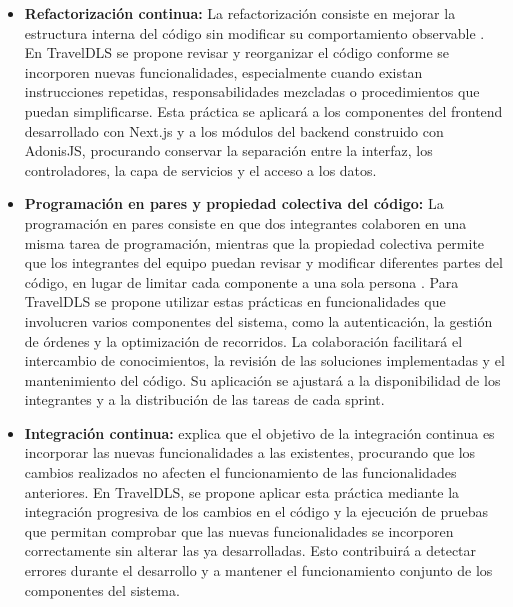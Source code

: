 \begin{itemize}
	\item \textbf{Refactorización continua:} La refactorización consiste en mejorar la estructura interna del código sin modificar su comportamiento observable \parencite{beck2000xp}. En TravelDLS se propone revisar y reorganizar el código conforme se incorporen nuevas funcionalidades, especialmente cuando existan instrucciones repetidas, responsabilidades mezcladas o procedimientos que puedan simplificarse. Esta práctica se aplicará a los componentes del frontend desarrollado con Next.js y a los módulos del backend construido con AdonisJS, procurando conservar la separación entre la interfaz, los controladores, la capa de servicios y el acceso a los datos.

	\item \textbf{Programación en pares y propiedad colectiva del código:} La programación en pares consiste en que dos integrantes colaboren en una misma tarea de programación, mientras que la propiedad colectiva permite que los integrantes del equipo puedan revisar y modificar diferentes partes del código, en lugar de limitar cada componente a una sola persona \parencite{beck2000xp}. Para TravelDLS se propone utilizar estas prácticas en funcionalidades que involucren varios componentes del sistema, como la autenticación, la gestión de órdenes y la optimización de recorridos. La colaboración facilitará el intercambio de conocimientos, la revisión de las soluciones implementadas y el mantenimiento del código. Su aplicación se ajustará a la disponibilidad de los integrantes y a la distribución de las tareas de cada sprint.
\end{itemize}

\begin{itemize}
	\item \textbf{Integración continua:} \textcite{bahit2012scrum} explica que el objetivo de la integración continua es incorporar las nuevas funcionalidades a las existentes, procurando que los cambios realizados no afecten el funcionamiento de las funcionalidades anteriores. En TravelDLS, se propone aplicar esta práctica mediante la integración progresiva de los cambios en el código y la ejecución de pruebas que permitan comprobar que las nuevas funcionalidades se incorporen correctamente sin alterar las ya desarrolladas. Esto contribuirá a detectar errores durante el desarrollo y a mantener el funcionamiento conjunto de los componentes del sistema.
\end{itemize}

